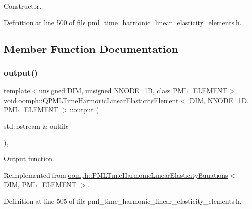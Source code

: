 Constructor. 



Definition at line 500 of file pml\+\_\+time\+\_\+harmonic\+\_\+linear\+\_\+elasticity\+\_\+elements.\+h.



\subsection{Member Function Documentation}
\mbox{\label{classoomph_1_1QPMLTimeHarmonicLinearElasticityElement_a810b433071811f8f79e998e6f418e7fb}} 
\subsubsection{\texorpdfstring{output()}{output()}\hspace{0.1cm}{\footnotesize\ttfamily [1/4]}}
{\footnotesize\ttfamily template$<$unsigned D\+IM, unsigned N\+N\+O\+D\+E\+\_\+1D, class P\+M\+L\+\_\+\+E\+L\+E\+M\+E\+NT$>$ \\
void \hyperlink{classoomph_1_1QPMLTimeHarmonicLinearElasticityElement}{oomph\+::\+Q\+P\+M\+L\+Time\+Harmonic\+Linear\+Elasticity\+Element}$<$ D\+IM, N\+N\+O\+D\+E\+\_\+1D, P\+M\+L\+\_\+\+E\+L\+E\+M\+E\+NT $>$\+::output (\begin{DoxyParamCaption}\item[{std\+::ostream \&}]{outfile }\end{DoxyParamCaption})\hspace{0.3cm}{\ttfamily [inline]}, {\ttfamily [virtual]}}



Output function. 



Reimplemented from \hyperlink{classoomph_1_1PMLTimeHarmonicLinearElasticityEquations_ab033b94bb8665cb782011cf4f12824e9}{oomph\+::\+P\+M\+L\+Time\+Harmonic\+Linear\+Elasticity\+Equations$<$ D\+I\+M, P\+M\+L\+\_\+\+E\+L\+E\+M\+E\+N\+T $>$}.



Definition at line 505 of file pml\+\_\+time\+\_\+harmonic\+\_\+linear\+\_\+elasticity\+\_\+elements.\+h.

